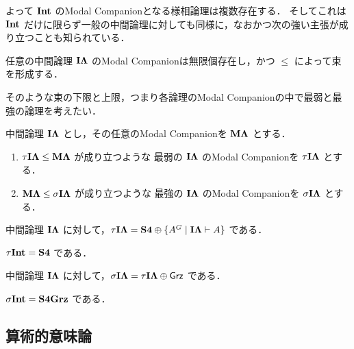 \documentclass{jsarticle}
\begin{document}
よって $\mathbf{Int}$ のModal Companionとなる様相論理は複数存在する．
そしてこれは $\mathbf{Int}$ だけに限らず一般の中間論理に対しても同様に，なおかつ次の強い主張が成り立つことも知られている．

\begin{theorem}
	任意の中間論理 $\mathbf{I\Lambda}$ のModal Companionは無限個存在し，かつ $\leq$ によって束を形成する．
\end{theorem}

そのような束の下限と上限，つまり各論理のModal Companionの中で最弱と最強の論理を考えたい．

\begin{definition}
	中間論理 $\mathbf{I\Lambda}$ とし，その任意のModal Companionを $\mathbf{M\Lambda}$ とする．

	\begin{enumerate}
		\item
		      $\tau\mathbf{I\Lambda} \leq \mathbf{M\Lambda}$ が成り立つような
		      最弱の $\mathbf{I\Lambda}$ のModal Companionを $\tau\mathbf{I\Lambda}$ とする．
		\item
		      $\mathbf{M\Lambda} \leq \sigma\mathbf{I\Lambda}$ が成り立つような
		      最強の $\mathbf{I\Lambda}$ のModal Companionを $\sigma\mathbf{I\Lambda}$ とする．
	\end{enumerate}
\end{definition}

\begin{theorem}
	中間論理 $\mathbf{I\Lambda}$ に対して，$\tau \mathbf{I\Lambda} = \mathbf{S4} \oplus \{ A^G \mid \mathbf{I\Lambda} \vdash A \} $ である．
\end{theorem}

\begin{corollary}
	$\tau \mathbf{Int} = \mathbf{S4}$ である．
\end{corollary}

\begin{theorem}
	中間論理 $\mathbf{I\Lambda}$ に対して，$\sigma \mathbf{I\Lambda} = \tau\mathbf{I\Lambda} \oplus \mathsf{Grz}$ である．
\end{theorem}

\begin{corollary}
	$\sigma \mathbf{Int} = \mathbf{S4Grz}$ である．
\end{corollary}


\subsection{算術的意味論}
\end{document}
